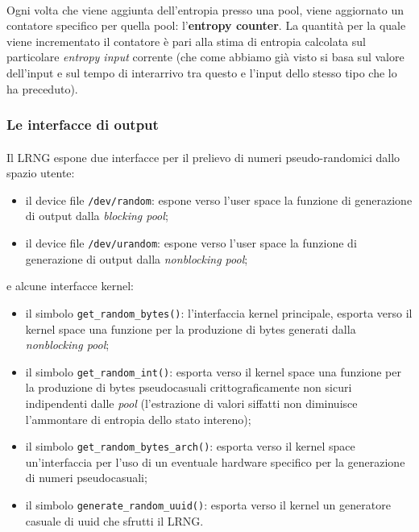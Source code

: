 \documentclass{article}
\begin{document}
 
 \paragraph{}Ogni volta che viene aggiunta dell'entropia presso una pool, viene
 aggiornato un contatore specifico per quella pool: l'\textbf{entropy counter}.
 La quantità per la quale viene incrementato il contatore è pari alla stima di
 entropia calcolata sul particolare \emph{entropy input} corrente (che come
 abbiamo già visto si basa sul valore dell'input e sul tempo di interarrivo tra
 questo e l'input dello stesso tipo che lo ha preceduto).
 \subsubsection{Le interfacce di output}\label{interfacceoutput}
 \paragraph{}Il LRNG espone due interfacce per il prelievo di
 numeri pseudo-randomici dallo spazio utente:
 \begin{itemize}
   \item il device file \verb+/dev/random+: espone verso l'user space la
   funzione di generazione di output dalla \emph{blocking pool};
   \item il device file \verb+/dev/urandom+: espone verso l'user space la
   funzione di generazione di output dalla \emph{nonblocking pool};
   
 \end{itemize}
 e alcune interfacce kernel:
 \begin{itemize}
	\item il simbolo \verb+get_random_bytes()+: l'interfaccia kernel
	principale, esporta verso il kernel space una funzione per la produzione di
	bytes generati dalla \emph{nonblocking pool};
   \item il simbolo \verb+get_random_int()+: esporta
   verso il kernel space una funzione per la produzione di bytes pseudocasuali
   crittograficamente non sicuri indipendenti dalle \emph{pool} (l'estrazione
   di valori siffatti non diminuisce l'ammontare di entropia dello stato
   intereno);
   \item il simbolo \verb+get_random_bytes_arch()+: esporta verso il kernel
   space un'interfaccia per l'uso di un eventuale hardware specifico per la 
   generazione di numeri pseudocasuali;
   \item il simbolo \verb+generate_random_uuid()+: esporta verso il kernel un
   generatore casuale di uuid che sfrutti il LRNG.
 \end{itemize}
\end{document}
